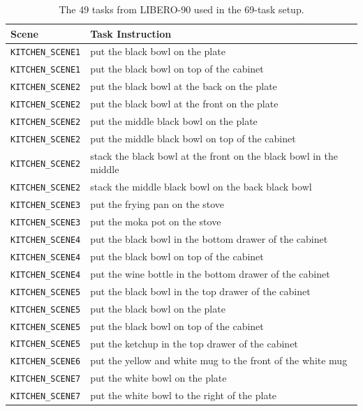 \begin{table}[t]
\centering
\footnotesize
\caption{The 49 tasks from LIBERO-90 used in the 69-task setup.}
\label{tab:libero90_tasks}
\begin{tabular}{ll}
\toprule
Scene & Task Instruction \\
\midrule
\texttt{KITCHEN\_SCENE1}      & put the black bowl on the plate \\
\texttt{KITCHEN\_SCENE1}      & put the black bowl on top of the cabinet \\
\texttt{KITCHEN\_SCENE2}      & put the black bowl at the back on the plate \\
\texttt{KITCHEN\_SCENE2}      & put the black bowl at the front on the plate \\
\texttt{KITCHEN\_SCENE2}      & put the middle black bowl on the plate \\
\texttt{KITCHEN\_SCENE2}      & put the middle black bowl on top of the cabinet \\
\texttt{KITCHEN\_SCENE2}      & stack the black bowl at the front on the black bowl in the middle \\
\texttt{KITCHEN\_SCENE2}      & stack the middle black bowl on the back black bowl \\
\texttt{KITCHEN\_SCENE3}      & put the frying pan on the stove \\
\texttt{KITCHEN\_SCENE3}      & put the moka pot on the stove \\
\texttt{KITCHEN\_SCENE4}      & put the black bowl in the bottom drawer of the cabinet \\
\texttt{KITCHEN\_SCENE4}      & put the black bowl on top of the cabinet \\
\texttt{KITCHEN\_SCENE4}      & put the wine bottle in the bottom drawer of the cabinet \\
\texttt{KITCHEN\_SCENE5}      & put the black bowl in the top drawer of the cabinet \\
\texttt{KITCHEN\_SCENE5}      & put the black bowl on the plate \\
\texttt{KITCHEN\_SCENE5}      & put the black bowl on top of the cabinet \\
\texttt{KITCHEN\_SCENE5}      & put the ketchup in the top drawer of the cabinet \\
\texttt{KITCHEN\_SCENE6}      & put the yellow and white mug to the front of the white mug \\
\texttt{KITCHEN\_SCENE7}      & put the white bowl on the plate \\
\texttt{KITCHEN\_SCENE7}      & put the white bowl to the right of the plate \\

\end{tabular}
\end{table}
